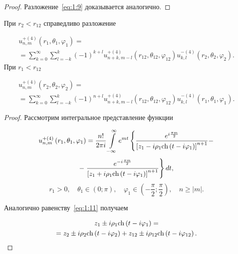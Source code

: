 \begin{russian}
\begin{proof}
Разложение~\eqref{eq:1:9} доказывается аналогично.
\end{proof}

\begin{theorem}
При ${r_2} < {r_{12}}$ справедливо разложение

\begin{multline}\label{eq:1:15}
u_{n,m}^{ + (4)}\left( {{r_1},{\theta _1},{\varphi _1}} \right) = \\
= \sum\limits_{k = 0}^\infty  {\sum\limits_{l =  - k}^k {{{( - 1)}^{k + l}}} } u_{n + k,m - l}^{ + (4)}\left( {{r_{12}},{\theta _{12}},{\varphi _{12}}} \right)u_{k,l}^{ - (4)}\left( {{r_2},{\theta _2},{\varphi _2}} \right).
\end{multline}
При  ${r_1} < {r_{12}}$

\begin{multline}
u_{n,m}^{ + (4)}\left( {{r_2},{\theta _2},{\varphi _2}} \right) = \\
= \sum\limits_{k = 0}^\infty  {\sum\limits_{l =  - k}^k {{{( - 1)}^{n + l}}} } u_{n + k,m - l}^{ + (4)}\left( {{r_{12}},{\theta _{12}},{\varphi _{12}}} \right)u_{k,l}^{ - (4)}\left( {{r_1},{\theta _1},{\varphi _1}} \right).
\label{eq:1:16a}
\end{multline}
\end{theorem}

\begin{proof}
Рассмотрим интегральное представление функции~\cite{Nikolaev1998-1}

\[u_{n,m}^{ + (4)}\left( {{r_1},{\theta _1},{\varphi _1}} \right) = \frac{{n!}}{{2\pi i}}\int\limits_{ - \infty }^\infty  {{e^{mt}}} \left\{ {\frac{{{e^{i\frac{{\pi m}}{2}}}}}{{{{\left[ {{z_1} - i{\rho _1}{\mathop{\rm ch}\nolimits} \left( {t - i{\varphi _1}} \right)} \right]}^{n + 1}}}} - } \right.\]
\begin{equation}\label{eq:1:17}
- \left. {\frac{{{e^{ - i\frac{{\pi m}}{2}}}}}{{{{\left[ {{z_1} + i{\rho _1}{\mathop{\rm ch}\nolimits} \left( {t - i{\varphi _1}} \right)} \right]}^{n + 1}}}}} \right\}dt,
\end{equation}
\[{r_1} > 0,\quad {\theta _1} \in (0;\pi ),\quad {\varphi _1} \in \left( { - \frac{\pi }{2};\frac{\pi }{2}} \right),\quad n \ge |m|.\]

Аналогично равенству~\eqref{eq:1:11} получаем

\begin{multline}\label{eq:1:18}
{z_1} \pm i{\rho _1}{\mathop{\rm ch}\nolimits} \left( {t - i{\varphi _1}} \right) = \\
= {z_2} \pm i{\rho _2}{\mathop{\rm ch}\nolimits} \left( {t - i{\varphi _2}} \right) + {z_{12}} \pm i{\rho _{12}}{\mathop{\rm ch}\nolimits} \left( {t - i{\varphi _{12}}} \right).
\end{multline}


\end{proof}
\end{russian}
